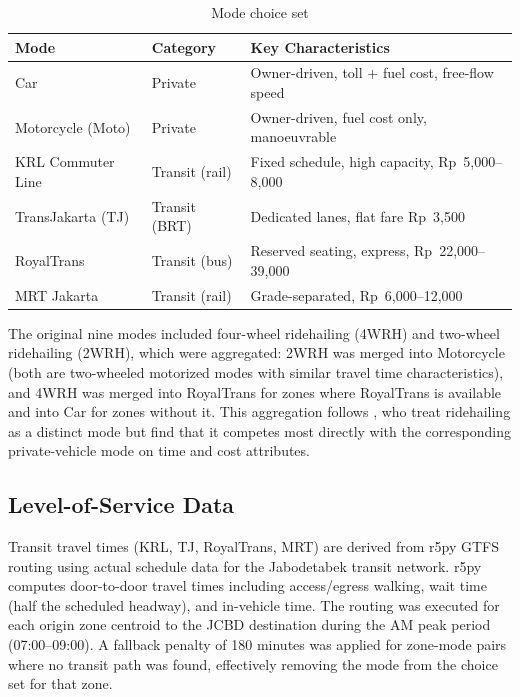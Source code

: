 \documentclass[12pt,a4paper]{article}
\begin{document}
\begin{table}[ht]
\centering
\caption{Mode choice set}
\label{tab:modes}
\begin{tabular}{lll}
\toprule
Mode & Category & Key Characteristics \\
\midrule
Car                 & Private          & Owner-driven, toll $+$ fuel cost, free-flow speed \\
Motorcycle (Moto)   & Private          & Owner-driven, fuel cost only, manoeuvrable \\
KRL Commuter Line   & Transit (rail)   & Fixed schedule, high capacity, Rp~5,000--8,000 \\
TransJakarta (TJ)   & Transit (BRT)    & Dedicated lanes, flat fare Rp~3,500 \\
RoyalTrans          & Transit (bus)    & Reserved seating, express, Rp~22,000--39,000 \\
MRT Jakarta         & Transit (rail)   & Grade-separated, Rp~6,000--12,000 \\
\bottomrule
\end{tabular}
\end{table}

The original nine modes included four-wheel ridehailing (4WRH) and two-wheel ridehailing (2WRH), which were aggregated: 2WRH was merged into Motorcycle (both are two-wheeled motorized modes with similar travel time characteristics), and 4WRH was merged into RoyalTrans for zones where RoyalTrans is available and into Car for zones without it. This aggregation follows \citet{ilahi2021}, who treat ridehailing as a distinct mode but find that it competes most directly with the corresponding private-vehicle mode on time and cost attributes.

\subsection{Level-of-Service Data}

Transit travel times (KRL, TJ, RoyalTrans, MRT) are derived from r5py GTFS routing using actual schedule data for the Jabodetabek transit network. r5py computes door-to-door travel times including access/egress walking, wait time (half the scheduled headway), and in-vehicle time. The routing was executed for each origin zone centroid to the JCBD destination during the AM peak period (07:00--09:00). A fallback penalty of 180 minutes was applied for zone-mode pairs where no transit path was found, effectively removing the mode from the choice set for that zone.
\end{document}
